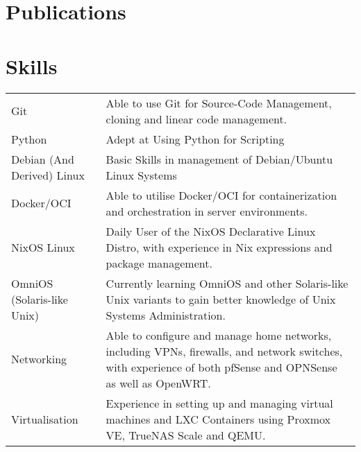 \documentclass[a4paper,12pt]{article}
\begin{document}
\section{Publications}
\begin{refsection}
\nocite{sfm2024}
\printbibliography[heading=none]
\end{refsection}

\section{Skills}
\begin{tabularx}{\linewidth}{@{}l X@{}}
Git &  \normalsize{Able to use Git for Source-Code Management, cloning and linear code management.}\\
Python  &  \normalsize{Adept at Using Python for Scripting}\\ 
Debian (And Derived) Linux  &  \normalsize{Basic Skills in management of Debian/Ubuntu Linux Systems}\\ 
Docker/OCI  &  \normalsize{Able to utilise Docker/OCI for containerization and orchestration in server environments.}\\ 
NixOS Linux  &  \normalsize{Daily User of the NixOS Declarative Linux Distro, with experience in Nix expressions and package management.}\\ 
OmniOS (Solaris-like Unix)  &  \normalsize{Currently learning OmniOS and other Solaris-like Unix variants to gain better knowledge of Unix Systems Administration.}\\ 
Networking  &  \normalsize{Able to configure and manage home networks, including VPNs, firewalls, and network switches, with experience of both pfSense and OPNSense as well as OpenWRT.}\\
Virtualisation  &  \normalsize{Experience in setting up and managing virtual machines and LXC Containers using Proxmox VE, TrueNAS Scale and QEMU.}\\

\end{tabularx}

\vfill
\end{document}
